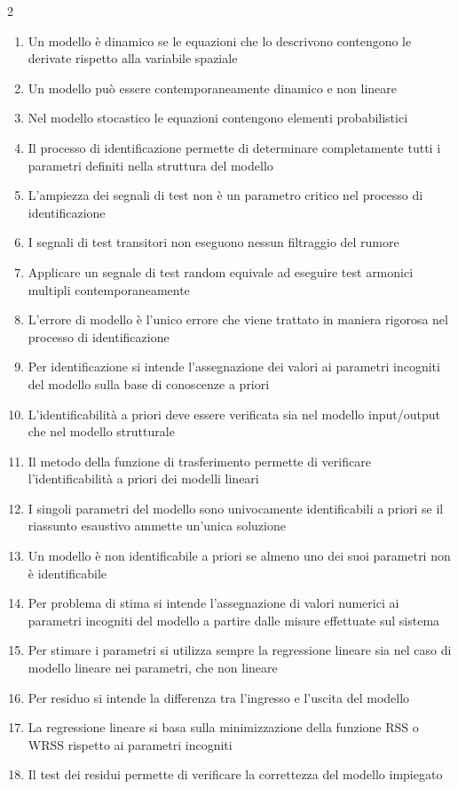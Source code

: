 \begin{multicols}{2}
\begin{enumerate}
    \item Un modello è dinamico se le equazioni che lo descrivono contengono le derivate rispetto alla variabile spaziale 
    \item Un modello può essere contemporaneamente dinamico e non lineare 
    \item Nel modello stocastico le equazioni contengono elementi probabilistici  
    \item Il processo di identificazione permette di determinare completamente tutti i parametri definiti nella struttura del modello 
    \item L'ampiezza dei segnali di test non è un parametro critico nel processo di identificazione 
    \item I segnali di test transitori non eseguono nessun filtraggio del rumore 
    \item Applicare un segnale di test random equivale ad eseguire test armonici multipli contemporaneamente 
    \item   L'errore di modello è l'unico errore che viene trattato in maniera rigorosa nel processo di identificazione
    \item Per identificazione si intende l'assegnazione dei valori ai parametri incogniti del modello sulla base di conoscenze a priori 
    \item L'identificabilità a priori deve essere verificata sia nel modello input/output che nel modello strutturale 
    \item Il metodo della funzione di trasferimento permette di verificare l'identificabilità a priori dei modelli lineari 
    \item I singoli parametri del modello sono univocamente identificabili a priori se il riassunto esaustivo ammette un'unica soluzione 
    \item Un modello è non identificabile a priori se almeno uno dei suoi parametri non è identificabile   
    \item Per problema di stima si intende l'assegnazione di valori numerici ai parametri incogniti del modello a partire dalle misure effettuate sul sistema 
    \item Per stimare i parametri si utilizza sempre la regressione lineare sia nel caso di modello lineare nei parametri, che non lineare 
    \item Per residuo si intende la differenza tra l'ingresso e l'uscita del modello 
    \item La regressione lineare si basa sulla minimizzazione della funzione RSS o WRSS rispetto ai parametri incogniti 
    \item Il test dei residui permette di verificare la correttezza del modello impiegato
\end{enumerate}
\end{multicols}
